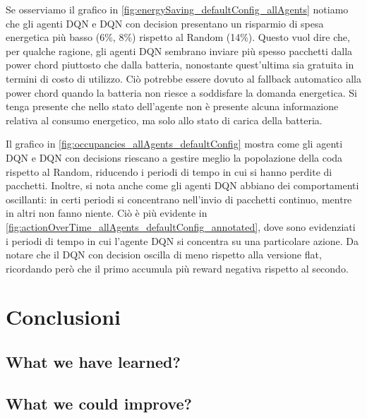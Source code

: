 \documentclass[conference]{IEEEtran}
\begin{document}
Se osserviamo il grafico in \autoref{fig:energySaving_defaultConfig_allAgents} notiamo
che gli agenti DQN e DQN con decision presentano un risparmio di spesa energetica più
basso (6\%, 8\%) rispetto al Random (14\%). Questo vuol dire che, per qualche ragione,
gli agenti DQN
sembrano inviare più spesso pacchetti dalla power chord piuttosto che dalla batteria,
nonostante quest'ultima sia gratuita in termini di costo di utilizzo. Ciò potrebbe
essere dovuto al fallback automatico alla power chord quando la batteria non riesce
a soddisfare la domanda energetica. Si tenga presente che nello stato dell'agente non
è presente alcuna informazione relativa al consumo energetico, ma solo allo stato
di carica della batteria.

Il grafico in \autoref{fig:occupancies_allAgents_defaultConfig} mostra come gli agenti
DQN e DQN con decisions riescano a gestire meglio la popolazione della coda rispetto al
Random, riducendo i periodi di tempo in cui si hanno perdite di pacchetti. Inoltre,
si nota anche come gli agenti DQN abbiano dei comportamenti oscillanti: in certi periodi
si concentrano nell'invio di pacchetti continuo, mentre in altri non fanno niente. Ciò
è più evidente in \autoref{fig:actionOverTime_allAgents_defaultConfig_annotated}, dove
sono evidenziati i periodi di tempo in cui l'agente DQN si concentra su una particolare
azione. Da notare che il DQN con decision oscilla di meno rispetto alla versione flat,
ricordando però che il primo accumula più reward negativa rispetto al secondo.


\section{Conclusioni}

\subsection{What we have learned?}

\subsection{What we could improve?}

\end{document}
